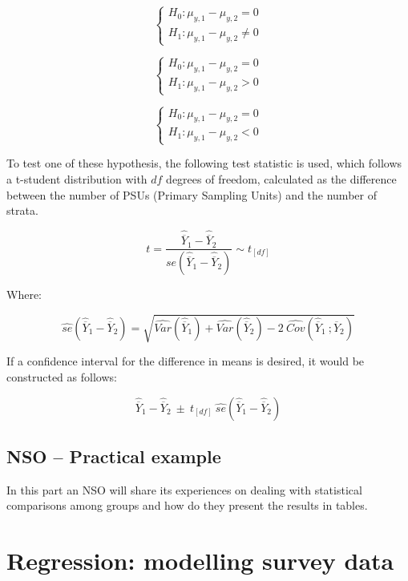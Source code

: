 \documentclass[
  12pt,
]{book}
\begin{document}
\[
\begin{cases}
H_0: \mu_{y,1} - \mu_{y,2} = 0 \\
H_1: \mu_{y,1} - \mu_{y,2} \neq 0
\end{cases} 
\]

\[
\begin{cases}
H_0: \mu_{y,1} - \mu_{y,2} = 0 \\
H_1: \mu_{y,1} - \mu_{y,2} > 0
\end{cases}
\]

\[
\begin{cases}
H_0: \mu_{y,1} - \mu_{y,2} = 0 \\
H_1: \mu_{y,1} - \mu_{y,2} < 0
\end{cases}
\]

To test one of these hypothesis, the following test statistic is used, which follows a t-student distribution with \(df\) degrees of freedom, calculated as the difference between the number of PSUs (Primary Sampling Units) and the number of strata.

\[
t = \frac{\widehat{\overline{Y}}_{1} - \widehat{\overline{Y}}_{2}} {se\left(\widehat{\overline{Y}}_{1} - \widehat{\overline{Y}}_{2}\right)} \sim t_{[df]}
\]

Where:

\[
\widehat{se} \left( \widehat{\overline{Y}}_{1} - \widehat{\overline{Y}}_{2} \right) = \sqrt{\widehat{Var}\left(\widehat{\overline{Y}}_{1}\right) + \widehat{Var}\left(\widehat{\overline{Y}}_{2}\right) - 2 \  \widehat{Cov}\left(\widehat{\overline{Y}}_{1} \ ; \widehat{\overline{Y}}_{2} \right)}
\]

If a confidence interval for the difference in means is desired, it would be constructed as follows:

\[
\widehat{\overline{Y}}_{1} - \widehat{\overline{Y}}_{2} \ \pm \ t_{[df]} \ \widehat{se}\left( \widehat{\overline{Y}}_{1} - \widehat{\overline{Y}}_{2} \right)
\]

\section{NSO -- Practical example}\label{nso-practical-example-1}

In this part an NSO will share its experiences on dealing with statistical comparisons among groups and how do they present the results in tables.

\chapter{Regression: modelling survey data}\label{regression-modelling-survey-data}
\end{document}
